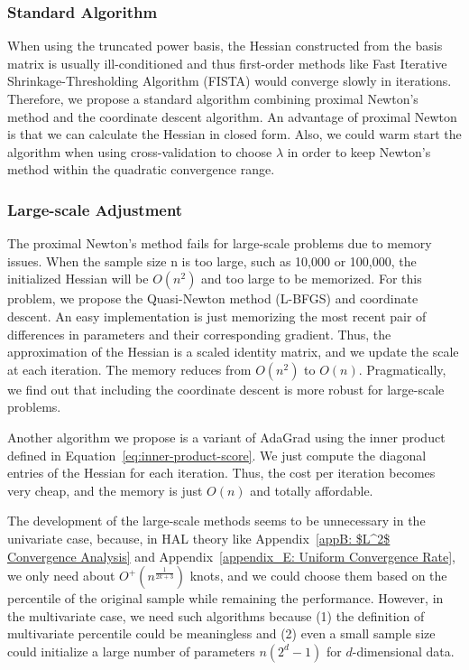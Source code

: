 \subsubsection{Standard Algorithm} When using the truncated power basis, the Hessian constructed from the basis matrix is usually ill-conditioned and thus first-order methods like Fast Iterative Shrinkage-Thresholding Algorithm (FISTA) would converge slowly in iterations. Therefore, we propose a standard algorithm combining proximal Newton's method and the coordinate descent algorithm. An advantage of proximal Newton is that we can calculate the Hessian in closed form. Also, we could warm start the algorithm when using cross-validation to choose $\lambda$ in order to keep Newton's method within the quadratic convergence range. 

\subsubsection{Large-scale Adjustment} The proximal Newton's method fails for large-scale problems due to memory issues. When the sample size n is too large, such as 10,000 or 100,000, the initialized Hessian will be $O(n^2)$ and too large to be memorized. For this problem, we propose the Quasi-Newton method (L-BFGS) and coordinate descent. An easy implementation is just memorizing the most recent pair of differences in parameters and their corresponding gradient. Thus, the approximation of the Hessian is a scaled identity matrix, and we update the scale at each iteration. The memory reduces from $O(n^2)$ to $O(n)$. Pragmatically, we find out that including the coordinate descent is more robust for large-scale problems.

Another algorithm we propose is a variant of AdaGrad using the inner product defined in Equation~\ref{eq:inner-product-score}. We just compute the diagonal entries of the Hessian for each iteration. Thus, the cost per iteration becomes very cheap, and the memory is just $O(n)$ and totally affordable. 

\begin{remark}
The development of the large-scale methods seems to be unnecessary in the univariate case, because, in HAL theory like Appendix~\ref{appB: $L^2$ Convergence Analysis} and Appendix~\ref{appendix_E: Uniform Convergence Rate}, we only need about $O^+(n^{\frac{1}{2k+3}})$ knots, and we could choose them based on the percentile of the original sample while remaining the performance. However, in the multivariate case, we need such algorithms because (1) the definition of multivariate percentile could be meaningless and (2) even a small sample size could initialize a large number of parameters $n(2^d - 1)$ for $ d$-dimensional data.
\end{remark}

